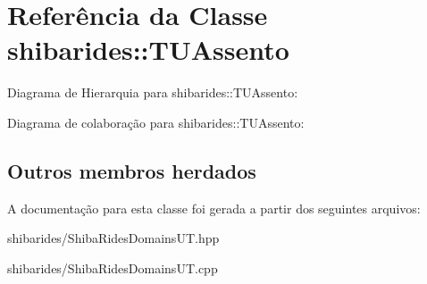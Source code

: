 \hypertarget{classshibarides_1_1TUAssento}{}\section{Referência da Classe shibarides\+:\+:T\+U\+Assento}
\label{classshibarides_1_1TUAssento}


Diagrama de Hierarquia para shibarides\+:\+:T\+U\+Assento\+:


Diagrama de colaboração para shibarides\+:\+:T\+U\+Assento\+:
\subsection*{Outros membros herdados}


A documentação para esta classe foi gerada a partir dos seguintes arquivos\+:\begin{DoxyCompactItemize}
\item 
shibarides/Shiba\+Rides\+Domains\+U\+T.\+hpp\item 
shibarides/Shiba\+Rides\+Domains\+U\+T.\+cpp\end{DoxyCompactItemize}
